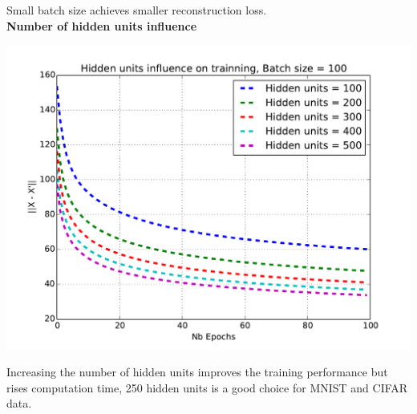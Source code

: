 \documentclass[landscape,a1paper,fontscale=0.5]{baposter} %
\begin{document}
\begin{poster}
{\begin{multicols}{2}
Small batch size achieves smaller reconstruction loss. \\

\textbf{Number of hidden units influence}
\begin{center}
	\centering
	\includegraphics[width=\linewidth,height=0.65\linewidth]{hidden_units}
\end{center}
Increasing the number of hidden units improves the training performance but rises computation time, 250 hidden units is a good choice for MNIST and CIFAR data. 

\end{multicols}

}





\end{poster}
\end{document}
